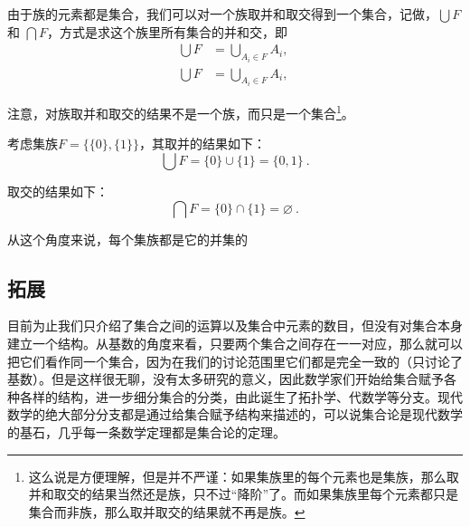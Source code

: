 由于族的元素都是集合，我们可以对一个族取并和取交得到一个集合，记做，$\bigcup F$ 和 $\bigcap F$，方式是求这个族里所有集合的并和交，即
$$
\begin{aligned}
\bigcup F &= \bigcup_{A_i \in F} A_i, \\
\bigcup F &= \bigcup_{A_i \in F} A_i,
\end{aligned}~
$$


注意，对族取并和取交的结果不是一个族，而只是一个集合\footnote{这么说是方便理解，但是并不严谨：如果集族里的每个元素也是集族，那么取并和取交的结果当然还是族，只不过“降阶”了。而如果集族里每个元素都只是集合而非族，那么取并取交的结果就不再是族。}。

\begin{example}{}
考虑集族$F=\{\{0\}, \{1\}\}$，其取并的结果如下：
\begin{equation}
\bigcup F=\{0\}\cup\{1\}=\{0, 1\}~.
\end{equation}

取交的结果如下：
\begin{equation}
\bigcap F=\{0\}\cap\{1\}=\varnothing~.
\end{equation}
\end{example}

从这个角度来说，每个集族都是它的并集的

\subsection{拓展}
目前为止我们只介绍了集合之间的运算以及集合中元素的数目，但没有对集合本身建立一个结构。从基数的角度来看，只要两个集合之间存在一一对应，那么就可以把它们看作同一个集合，因为在我们的讨论范围里它们都是完全一致的（只讨论了基数）。但是这样很无聊，没有太多研究的意义，因此数学家们开始给集合赋予各种各样的结构，进一步细分集合的分类，由此诞生了拓扑学、代数学等分支。现代数学的绝大部分分支都是通过给集合赋予结构来描述的，可以说集合论是现代数学的基石，几乎每一条数学定理都是集合论的定理。
